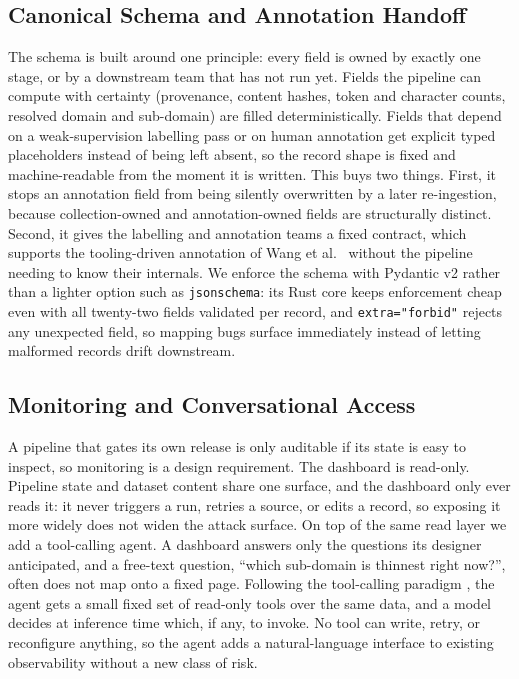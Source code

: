 \documentclass[conference]{IEEEtran}
\begin{document}
\subsection{Canonical Schema and Annotation Handoff}

The schema is built around one principle: every field is owned by
exactly one stage, or by a downstream team that has not run yet. Fields
the pipeline can compute with certainty (provenance, content hashes,
token and character counts, resolved domain and sub-domain) are filled
deterministically. Fields that depend on a weak-supervision labelling
pass or on human annotation get explicit typed placeholders instead of
being left absent, so the record shape is fixed and machine-readable
from the moment it is written. This buys two things. First, it stops an
annotation field from being silently overwritten by a later
re-ingestion, because collection-owned and annotation-owned fields are
structurally distinct. Second, it gives the labelling and annotation
teams a fixed contract, which supports the tooling-driven annotation of
Wang et al.\ \cite{wang2023selfinstruct} without the pipeline needing to
know their internals. We enforce the schema with Pydantic v2
\cite{pydanticv2} rather than a lighter option such as
\texttt{jsonschema}: its Rust core keeps enforcement cheap even with
all twenty-two fields validated per record, and \texttt{extra="forbid"}
rejects any unexpected field, so mapping bugs surface immediately
instead of letting malformed records drift downstream.

\subsection{Monitoring and Conversational Access}

A pipeline that gates its own release is only auditable if its state is
easy to inspect, so monitoring is a design requirement. The dashboard is
read-only. Pipeline state and dataset content share one surface, and the
dashboard only ever reads it: it never triggers a run, retries a source,
or edits a record, so exposing it more widely does not widen the attack
surface. On top of the same read layer we add a tool-calling agent. A
dashboard answers only the questions its designer anticipated, and a
free-text question, ``which sub-domain is thinnest right now?'', often
does not map onto a fixed page. Following the tool-calling paradigm
\cite{schick2023toolformer}, the agent gets a small fixed set of
read-only tools over the same data, and a model decides at inference
time which, if any, to invoke. No tool can write, retry, or reconfigure
anything, so the agent adds a natural-language interface to existing
observability without a new class of risk.
\end{document}
